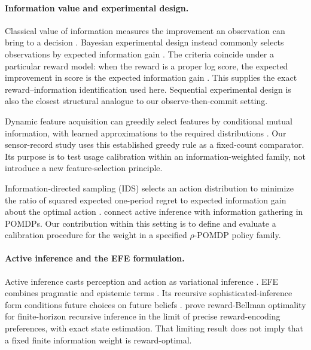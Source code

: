 \documentclass[manuscript, screen, review]{jair}
\begin{document}
\paragraph{Information value and experimental design.}
Classical value of information measures the improvement an observation can bring to a decision \citep{howard1966}. Bayesian experimental design instead commonly selects observations by expected information gain \citep{lindley1956,foster2021dad}. The criteria coincide under a particular reward model: when the reward is a proper log score, the expected improvement in score is the expected information gain \citep{bernardo1979}. This supplies the exact reward--information identification used here. Sequential experimental design is also the closest structural analogue to our observe-then-commit setting.

Dynamic feature acquisition can greedily select features by conditional mutual information, with learned approximations to the required distributions \citep{covert2023}. Our sensor-record study uses this established greedy rule as a fixed-count comparator. Its purpose is to test usage calibration within an information-weighted family, not introduce a new feature-selection principle.

Information-directed sampling (IDS) selects an action distribution to minimize the ratio of squared expected one-period regret to expected information gain about the optimal action \citep{russo2014}. \citet{walraven2024} connect active inference with information gathering in POMDPs. Our contribution within this setting is to define and evaluate a calibration procedure for the weight in a specified $\rho$-POMDP policy family.

\paragraph{Active inference and the EFE formulation.}
Active inference casts perception and action as variational inference \citep{friston2010,parr2022}. EFE combines pragmatic and epistemic terms \citep{friston2015,parr2019,dacosta2020}. Its recursive sophisticated-inference form conditions future choices on future beliefs \citep{friston2021}. \citet{dacosta2020b} prove reward-Bellman optimality for finite-horizon recursive inference in the limit of precise reward-encoding preferences, with exact state estimation. That limiting result does not imply that a fixed finite information weight is reward-optimal.
\end{document}
